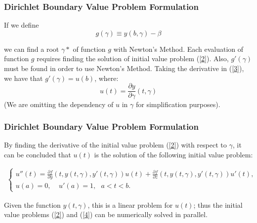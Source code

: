 \documentclass{beamer}
\begin{document}
\begin{frame}
\frametitle{Dirichlet Boundary Value Problem Formulation} %
If we define 
\begin{equation}\label{3}
        g(\gamma) \equiv y(b,\gamma) - \beta
\end{equation}

we can find a root $\gamma*$ of function $g$ with Newton's Method. Each evaluation of function $g$ requires finding the solution of initial value problem (\ref{2}). Also, $g'(\gamma)$ must be found in order to use Newton's Method. Taking the derivative in (\ref{3}), we have that $g'(\gamma) = u(b)$, where:
$$
u(t)=\frac{\partial y}{\partial \gamma}(t,\gamma)
$$
(We are omitting the dependency of $u$ in $\gamma$ for simplification purposes).
\end{frame}

\begin{frame}
\frametitle{Dirichlet Boundary Value Problem Formulation} %
By finding the derivative of the initial value problem (\ref{2}) with respect to $\gamma$, it can be concluded that $u(t)$ is the solution of the following initial value problem:

    \begin{equation}\label{4}
        \begin{aligned}
            \begin{cases}
                u''(t)=\frac{\partial f}{\partial y}(t,y(t,\gamma),y'(t,\gamma))u(t)+\frac{\partial f}{\partial z}(t,y(t,\gamma),y'(t,\gamma))u'(t),\\
                u(a)=0, \ \ \ \ \ u'(a)=1, \ \ \ a < t < b.
            \end{cases}
        \end{aligned}
    \end{equation}

Given the function $y(t,\gamma)$, this is a linear problem for $u(t)$; thus the initial value problems (\ref{2}) and (\ref{4}) can be numerically solved in parallel.
\end{frame}
\end{document}
